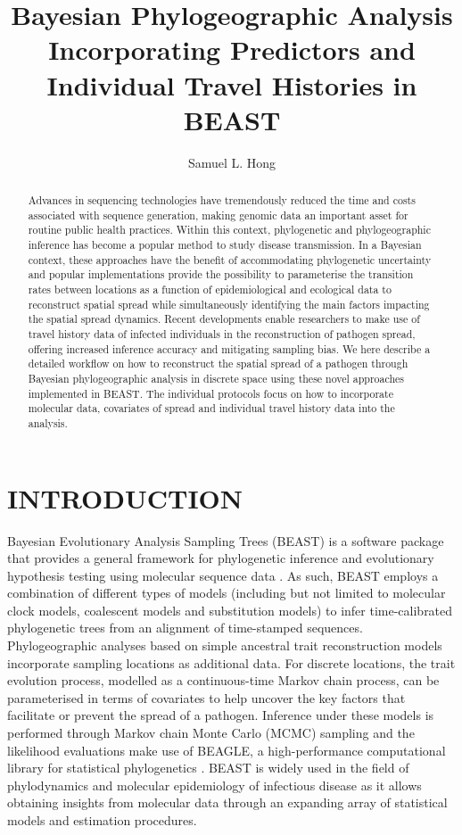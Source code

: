\documentclass{article}
\title{Bayesian Phylogeographic Analysis Incorporating Predictors and Individual Travel Histories in BEAST}
\author{Samuel L. Hong}
\begin{document}
\maketitle

\begin{abstract}
\begin{adjustwidth}{0.5cm}{0.5cm}
Advances in sequencing technologies have tremendously reduced the time and costs associated with sequence generation, making genomic data an important asset for routine public health practices. Within this context, phylogenetic and phylogeographic inference has become a popular method to study disease transmission.
In a Bayesian context, these approaches have the benefit of accommodating phylogenetic uncertainty and popular implementations provide the possibility to parameterise the transition rates between locations as a function of epidemiological and ecological data to reconstruct spatial spread while simultaneously identifying the main factors impacting the spatial spread dynamics.
Recent developments enable researchers to make use of travel history data of infected individuals in the reconstruction of pathogen spread, offering increased inference accuracy and mitigating sampling bias.
We here describe a detailed workflow on how to reconstruct the spatial spread of a pathogen through Bayesian phylogeographic analysis in discrete space using these novel approaches implemented in BEAST.
The individual protocols focus on how to incorporate molecular data, covariates of spread and individual travel history data into the analysis.
\end{adjustwidth}
\end{abstract}

\section*{INTRODUCTION}

Bayesian Evolutionary Analysis Sampling Trees (BEAST) \cite{beast110} is a software package that provides a general framework for phylogenetic inference and evolutionary hypothesis testing using molecular sequence data \cite{beastOG,beast17,beast110}.
As such, BEAST employs a combination of different types of models (including but not limited to molecular clock models, coalescent models and substitution models) to infer time-calibrated phylogenetic trees from an alignment of time-stamped sequences.
Phylogeographic analyses based on simple ancestral trait reconstruction models incorporate sampling locations as additional data.
For discrete locations, the trait evolution process, modelled as a continuous-time Markov chain process, can be parameterised in terms of covariates to help uncover the key factors that facilitate or prevent the spread of a pathogen.
Inference under these models is performed through Markov chain Monte Carlo (MCMC) sampling and the likelihood evaluations make use of BEAGLE, a high-performance computational library for statistical phylogenetics \cite{beagle3}.
BEAST is widely used in the field of phylodynamics and molecular epidemiology of infectious disease as it allows obtaining insights from molecular data through an expanding array of statistical models and estimation procedures. \\
\end{document}
